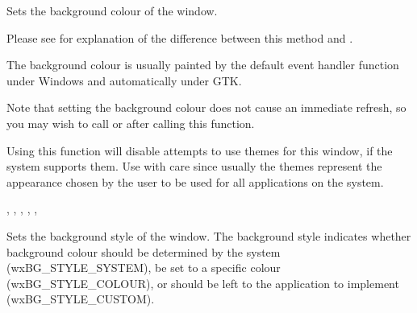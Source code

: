 


\label{wxwindowsetbackgroundcolour}


Sets the background colour of the window.

Please see  for
explanation of the difference between this method and
.




The background colour is usually painted by the default\rtfsp
{} event handler function
under Windows and automatically under GTK.

Note that setting the background colour does not cause an immediate refresh, so you
may wish to call  or  after
calling this function.

Using this function will disable attempts to use themes for this
window, if the system supports them.  Use with care since usually the
themes represent the appearance chosen by the user to be used for all
applications on the system.



,\rtfsp
{},\rtfsp
{},\rtfsp
{},\rtfsp
{},\rtfsp
{}

\label{wxwindowsetbackgroundstyle}


Sets the background style of the window. The background style indicates
whether background colour should be determined by the system (wxBG\_STYLE\_SYSTEM),
be set to a specific colour (wxBG\_STYLE\_COLOUR), or should be left to the
application to implement (wxBG\_STYLE\_CUSTOM).

